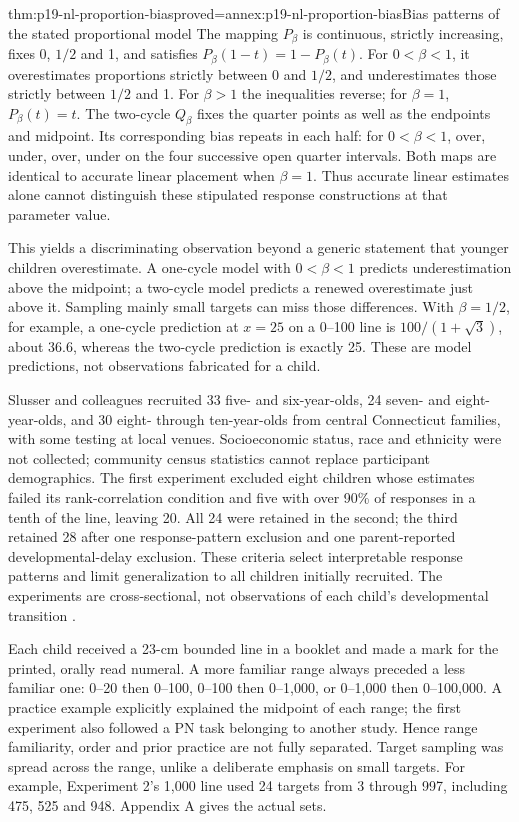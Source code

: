 \begin{hbtheorem}{thm:p19-nl-proportion-bias}{proved=annex:p19-nl-proportion-bias}{Bias patterns of the stated proportional model}
The mapping \(P_\beta\) is continuous, strictly increasing,
fixes 0, \(1/2\) and 1, and satisfies
\(P_\beta(1-t)=1-P_\beta(t)\).
For \(0<\beta<1\), it overestimates proportions strictly
between 0 and \(1/2\), and underestimates those strictly between
\(1/2\) and 1. For \(\beta>1\) the inequalities reverse;
for \(\beta=1\), \(P_\beta(t)=t\).
The two-cycle \(Q_\beta\) fixes the quarter points as well as
the endpoints and midpoint. Its corresponding bias repeats in
each half: for \(0<\beta<1\), over, under, over, under on the
four successive open quarter intervals. Both maps are identical
to accurate linear placement when \(\beta=1\).
Thus accurate linear estimates alone cannot distinguish these
stipulated response constructions at that parameter value.
\end{hbtheorem}

This yields a discriminating observation beyond a generic statement
that younger children overestimate. A one-cycle model with
\(0<\beta<1\) predicts underestimation above the midpoint;
a two-cycle model predicts a renewed overestimate just above it.
Sampling mainly small targets can miss those differences. With
\(\beta=1/2\), for example, a one-cycle prediction at \(x=25\)
on a 0--100 line is \(100/(1+\sqrt3)\), about 36.6, whereas
the two-cycle prediction is exactly 25. These are model predictions,
not observations fabricated for a child.

Slusser and colleagues recruited 33 five- and six-year-olds,
24 seven- and eight-year-olds, and 30 eight- through ten-year-olds
from central Connecticut families, with some testing at local venues.
Socioeconomic status, race and ethnicity were not collected; community
census statistics cannot replace participant demographics.
The first experiment excluded eight children whose estimates failed
its rank-correlation condition and five with over 90\% of responses
in a tenth of the line, leaving 20. All 24 were retained in the second;
the third retained 28 after one response-pattern exclusion and one
parent-reported developmental-delay exclusion. These criteria select
interpretable response patterns and limit generalization to all
children initially recruited. The experiments are cross-sectional,
not observations of each child's developmental transition
\cite[pp.~5--10]{SlusserEtAl2012OnlineProportionNL}.

Each child received a 23-cm bounded line in a booklet and made a
mark for the printed, orally read numeral. A more familiar range
always preceded a less familiar one: 0--20 then 0--100, 0--100 then
0--1,000, or 0--1,000 then 0--100,000. A practice example explicitly
explained the midpoint of each range; the first experiment also
followed a PN task belonging to another study. Hence range familiarity,
order and prior practice are not fully separated. Target sampling was
spread across the range, unlike a deliberate emphasis on small targets.
For example, Experiment 2's 1,000 line used 24 targets from 3 through
997, including 475, 525 and 948. Appendix A gives the actual sets.

